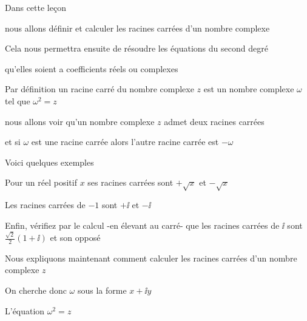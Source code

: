 







\debuttexte
\diapo

\change

Dans cette leçon 

\change

nous allons définir et calculer 
les racines carrées d'un nombre complexe

\change

Cela nous permettra ensuite de résoudre
les équations du second degré

qu'elles soient a coefficients réels ou complexes



\diapo

Par définition un racine carré du nombre complexe $z$
est un nombre complexe $\omega$ tel que $\omega^2=z$

\change

nous allons voir qu'un nombre complexe $z$ admet deux
racines carrées

et si $\omega$ est une racine carrée alors l'autre racine carrée
est $-\omega$

\change

Voici quelques exemples 

Pour un réel positif $x$ ses racines carrées sont $+\sqrt x$ et $- \sqrt x$

\change

Les racines carrées de $-1$ sont $+\ii$ et $-\ii$

\change

Enfin, vérifiez par le calcul -en élevant au carré- que les racines carrées de $\ii$
sont $\frac{\sqrt{2}}{2}(1+\ii)$ et son opposé


\diapo

Nous expliquons maintenant comment calculer les racines carrées d'un nombre complexe $z$



On cherche donc $\omega$ sous la forme $x+\ii y$ 

\change

L'équation $\omega^2=z$

